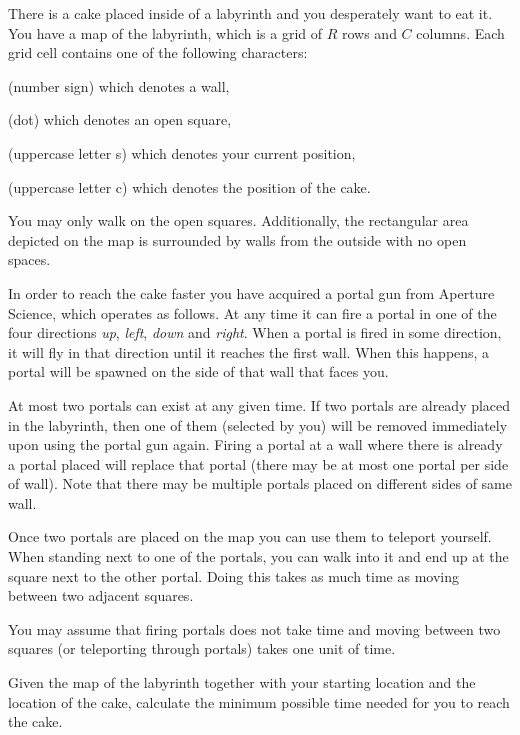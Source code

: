 \documentclass{../../../latex/boi2014-lt}
\newcommand{\constant}[1]{{\tt #1}}
\begin{document}
    There is a cake placed inside of a labyrinth and you desperately want
    to eat it. You have a map of the labyrinth, which is
    a grid of $R$ rows and $C$ columns.
    Each grid cell contains one of the following characters:
    \begin{description}[itemindent=1pt]
    	\item[\constant{\#}] (number sign) which denotes a wall,
        \item[\constant{.}] (dot) which denotes an open square,
        \item[\constant{S}] (uppercase letter s) which denotes your current position,
        \item[\constant{C}] (uppercase letter c) which denotes the position of the cake.
    \end{description}
    You may only walk on the open squares. Additionally, the rectangular
    area depicted on the map is surrounded by walls from the outside
    with no open spaces.

    In order to reach the cake faster you have acquired a portal gun from
    Aperture Science\texttrademark{}, which operates as follows.
    At any time it can fire a portal in one of the four directions
    \emph{up}, \emph{left}, \emph{down} and \emph{right}.
    When a portal is fired in some direction, it will fly in that direction
    until it reaches the first wall. When this happens, a portal
    will be spawned on the side of that wall that faces you.

    At most two portals can exist at any given time. If two portals
    are already placed in the labyrinth, then one of them (selected
    by you) will be removed immediately upon using the portal gun
    again. Firing a portal at a wall where there is already a portal
    placed will replace that portal (there may be at most one portal
    per side of wall).
    Note that there may be multiple portals placed
    on different sides of same wall.

    Once two portals are placed on the map you can use them to
    teleport yourself. When standing next to one of the portals,
    you can walk into it and end up at the square next to the other
    portal. Doing this takes as much time as moving between two
    adjacent squares.

    You may assume that firing portals does not take time and moving
    between two squares (or teleporting through portals) takes one unit
    of time.

    \Task
    Given the map of the labyrinth together with your starting location
    and the location of the cake, calculate the minimum possible time needed
    for you to reach the cake.
\end{document}
